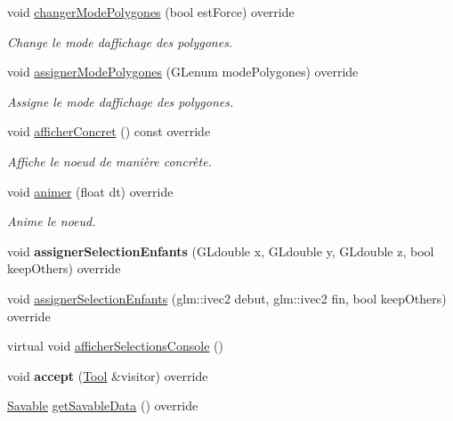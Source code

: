 \begin{DoxyCompactItemize}
void \hyperlink{group__inf2990_ga90bb01067866438b80d081967c133b81}{changer\+Mode\+Polygones} (bool est\+Force) override
\begin{DoxyCompactList}\small\item\em Change le mode d\textquotesingle{}affichage des polygones. \end{DoxyCompactList}\item 
void \hyperlink{group__inf2990_ga5caf8a3f9e06915463abdff7a473d95f}{assigner\+Mode\+Polygones} (G\+Lenum mode\+Polygones) override
\begin{DoxyCompactList}\small\item\em Assigne le mode d\textquotesingle{}affichage des polygones. \end{DoxyCompactList}\item 
void \hyperlink{group__inf2990_gaed396ee8ea0396e4a9cf56b69151204b}{afficher\+Concret} () const  override
\begin{DoxyCompactList}\small\item\em Affiche le noeud de manière concrète. \end{DoxyCompactList}\item 
void \hyperlink{group__inf2990_gac641c70147959a57b698854e016ff929}{animer} (float dt) override
\begin{DoxyCompactList}\small\item\em Anime le noeud. \end{DoxyCompactList}\item 
\hypertarget{group__inf2990_ga5fb967a439eb0ea7c326b23ea12700e9}{}void {\bfseries assigner\+Selection\+Enfants} (G\+Ldouble x, G\+Ldouble y, G\+Ldouble z, bool keep\+Others) override\label{group__inf2990_ga5fb967a439eb0ea7c326b23ea12700e9}

\item 
void \hyperlink{group__inf2990_ga98e4e00d1d92ebe6774f72dc712ee6ca}{assigner\+Selection\+Enfants} (glm\+::ivec2 debut, glm\+::ivec2 fin, bool keep\+Others) override
\item 
virtual void \hyperlink{group__inf2990_ga056eedb917326e84a2a41e726bb2347c}{afficher\+Selections\+Console} ()
\item 
\hypertarget{group__inf2990_ga0b60c180726f3a0501f42bc70bc0c52e}{}void {\bfseries accept} (\hyperlink{class_tool}{Tool} \&visitor) override\label{group__inf2990_ga0b60c180726f3a0501f42bc70bc0c52e}

\item 
\hyperlink{class_savable}{Savable} \hyperlink{group__inf2990_ga3fefd2b70f384f82cb6319f468c01a63}{get\+Savable\+Data} () override
\end{DoxyCompactItemize}
